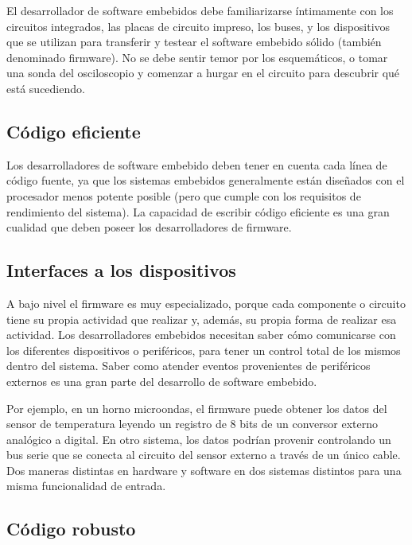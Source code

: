\documentclass[output=paper, 
colorlinks,
citecolor=brown,
newtxmath
]{langscibook}
\begin{document}
El desarrollador de software embebidos debe familiarizarse íntimamente con los 
circuitos integrados, las placas de circuito impreso, los buses, y los dispositivos 
que se utilizan para transferir y testear el software embebido sólido (también denominado firmware). 
No se debe sentir temor por los esquemáticos, o tomar una sonda del osciloscopio y 
comenzar a hurgar en el circuito para descubrir qué está sucediendo.



\subsection {Código eficiente}

Los desarrolladores de software embebido deben tener en cuenta
cada línea de código fuente, ya que los sistemas embebidos 
generalmente están diseñados con el procesador menos potente posible
(pero que cumple con los requisitos de rendimiento del sistema). 
La capacidad de escribir código eficiente es una gran cualidad
que deben poseer los desarrolladores de firmware.



\subsection {Interfaces a los dispositivos}

A bajo nivel el firmware es muy especializado, porque cada componente o circuito 
tiene su propia actividad que realizar y, además, su propia forma de realizar esa actividad. 
Los desarrolladores embebidos necesitan saber cómo comunicarse con 
los diferentes dispositivos o periféricos, para tener un control total de los mismos dentro
del sistema. Saber como atender eventos provenientes de periféricos externos es una gran 
parte del desarrollo de software embebido.

Por ejemplo, en un horno microondas, el firmware puede obtener los datos 
del sensor de temperatura leyendo un registro de 8 bits de un 
conversor externo analógico a digital. En otro sistema, los datos 
podrían provenir controlando un bus serie que se conecta al 
circuito del sensor externo a través de un único cable.
Dos maneras distintas en hardware y software en dos sistemas distintos
para una misma funcionalidad de entrada.


\subsection {Código robusto}
\end{document}
